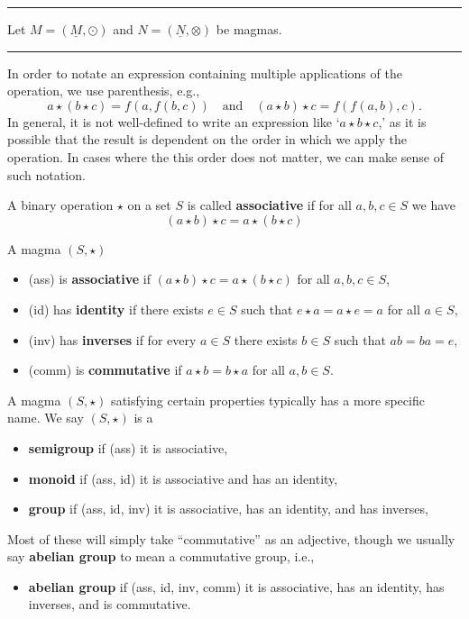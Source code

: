 \documentclass[12pt]{article}
\newcommand{\keyword}[1]{\textbf{#1}}
\newcommand{\sepline}{\rule{\textwidth}{0.4pt}}
\theoremstyle{definition}
\newcommand{\isp}[1]{\quad\text{#1}\quad}
\newcommand{\<}{\left\langle}
\renewcommand{\>}{\right\rangle}
\newcommand{\udl}{\underline}
\renewcommand{\_}[1]{{_{#1}}}
\begin{document}
\sepline

Let $M = (\udl{M}, \odot)$ and $N = (\udl{N}, \otimes)$ be magmas.

\sepline

In order to notate an expression containing multiple applications of the operation, we use parenthesis, e.g.,
\[
    a \star (b \star c) = f(a, f(b, c)) \isp{and} (a \star b) \star c = f(f(a, b), c).
\]
In general, it is not well-defined to write an expression like `$a \star b \star c$,' as it is possible that the result is dependent on the order in which we apply the operation.
In cases where the this order does not matter, we can make sense of such notation.

A binary operation $\star$ on a set $S$ is called \keyword{associative} if
for all $a, b, c \in S$ we have
\[
    (a \star b) \star c = a \star (b \star c)
\]

A magma $(S, \star)$
\begin{itemize}
    \item (ass) is \keyword{associative} if $(a \star b) \star c = a \star (b \star c)$ for all $a, b, c \in S$,
    \item (id) has \keyword{identity} if there exists $e \in S$ such that $e \star a = a \star e = a$ for all $a \in S$,
    \item (inv) has \keyword{inverses} if for every $a \in S$ there exists $b \in S$ such that $ab = ba = e$,
    \item (comm) is \keyword{commutative} if $a \star b = b \star a$ for all $a, b \in S$.
\end{itemize}

A magma $(S, \star)$ satisfying certain properties typically has a more specific name.
We say $(S, \star)$ is a
\begin{itemize}
    \item \keyword{semigroup} if (ass) it is associative,
    \item \keyword{monoid} if (ass, id) it is associative and has an identity,
    \item \keyword{group} if (ass, id, inv) it is associative, has an identity, and has inverses,
\end{itemize}
Most of these will simply take ``commutative'' as an adjective, though we usually say \keyword{abelian group} to mean a commutative group, i.e.,
\begin{itemize}
    \item \keyword{abelian group} if (ass, id, inv, comm) it is associative, has an identity, has inverses, and is commutative.
\end{itemize}
\end{document}
